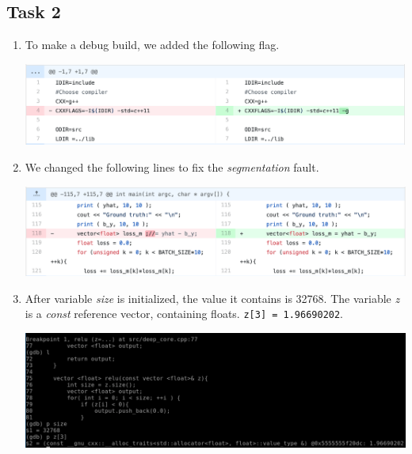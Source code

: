\documentclass[a4paper, DIV12, headsepline]{scrartcl}
\begin{document}
\subsection*{Task 2}
\begin{enumerate}[label=(\alph*)]
\item To make a debug build, we added the following flag.
\begin{center}
\includegraphics[scale=0.25]{task2.1.png}
\end{center}

\item We changed the following lines to fix the \textit{segmentation} fault.
\begin{center}
\includegraphics[scale=0.25]{task2.2.png}
\end{center}

\item After variable \textit{size} is initialized, the value it contains is 32768. The variable \textit{z} is a \textit{const} reference vector, containing floats. \verb|z[3] = 1.96690202|.
\begin{center}
	\includegraphics[scale=0.3]{task2.3.png}
\end{center}
\end{enumerate}
\end{document}
